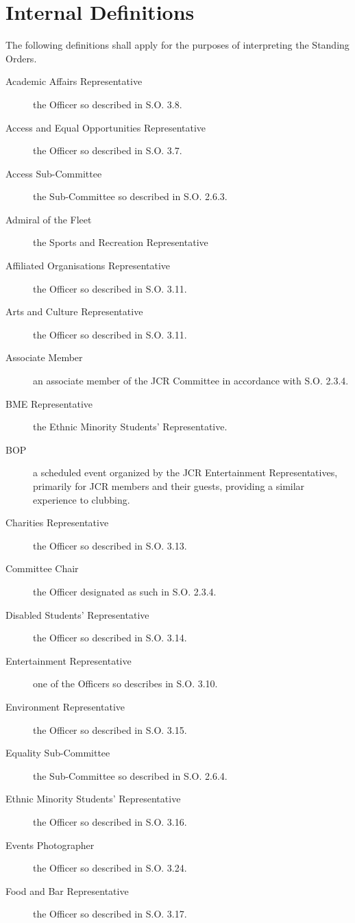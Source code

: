 \chapter{Internal Definitions}

\appnpara The following definitions shall apply for the purposes of interpreting the Standing Orders.
\begin{description}
\item[Academic Affairs Representative] the Officer so described in S.O. 3.8.
\item[Access and Equal Opportunities Representative] the Officer so described in S.O. 3.7.
\item[Access Sub-Committee] the Sub-Committee so described in S.O. 2.6.3.
\item[Admiral of the Fleet] the Sports and Recreation Representative
\item[Affiliated Organisations Representative] the Officer so described in S.O. 3.11.
\item[Arts and Culture Representative] the Officer so described in S.O. 3.11.
\item[Associate Member] an associate member of the JCR Committee in accordance with S.O. 2.3.4.
\item[BME Representative] the Ethnic Minority Students’ Representative.
\item[BOP] a scheduled event organized by the JCR Entertainment Representatives, primarily for JCR members and their guests, providing a similar experience to clubbing.
\item[Charities Representative] the Officer so described in S.O. 3.13.
\item[Committee Chair] the Officer designated as such in S.O. 2.3.4.
\item[Disabled Students’ Representative] the Officer so described in S.O. 3.14.
\item[Entertainment Representative] one of the Officers so describes in S.O. 3.10.
\item[Environment Representative] the Officer so described in S.O. 3.15.
\item[Equality Sub-Committee] the Sub-Committee so described in S.O. 2.6.4.
\item[Ethnic Minority Students' Representative] the Officer so described in S.O. 3.16.
\item[Events Photographer] the Officer so described in S.O. 3.24.
\item[Food and Bar Representative] the Officer so described in S.O. 3.17.

\end{description}
